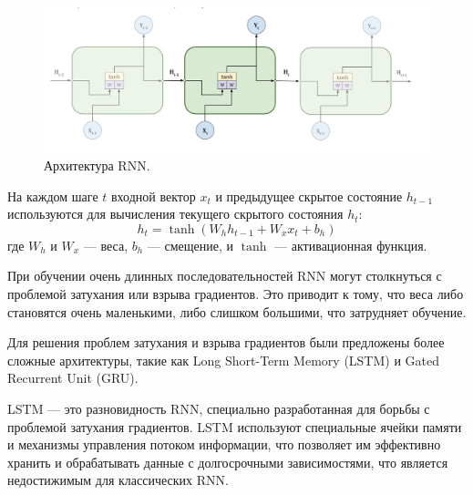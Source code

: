 \documentclass[a4paper,12pt]{extarticle}
\begin{document}
\begin{figure}[ht]
	\centering
	\includegraphics[scale=0.3]{rnn_arch.png}
	\caption{Архитектура RNN.}
	\label{fig:rnn_arch}
\end{figure}

На каждом шаге \( t \) входной вектор \( x_t \) и предыдущее скрытое состояние \( h_{t-1} \) используются для вычисления текущего скрытого состояния \( h_t \):
\begin{equation}
	\label{rnn_hidden_layer}
	h_t = \tanh(W_h h_{t-1} + W_x x_t + b_h)
\end{equation}
где \( W_h \) и \( W_x \) — веса, \( b_h \) — смещение, и \( \tanh \) — активационная функция.

При обучении очень длинных последовательностей RNN могут столкнуться с проблемой затухания или взрыва градиентов. Это приводит к тому, что веса либо становятся очень маленькими, либо слишком большими, что затрудняет обучение. 

Для решения проблем затухания и взрыва градиентов были предложены более сложные архитектуры, такие как Long Short-Term Memory (LSTM) и Gated Recurrent Unit (GRU).

LSTM — это разновидность RNN, специально разработанная для борьбы с проблемой затухания градиентов. LSTM используют специальные ячейки памяти и механизмы управления потоком информации, что позволяет им эффективно хранить и обрабатывать данные с долгосрочными зависимостями, что является недостижимым для классических RNN.
\end{document}
